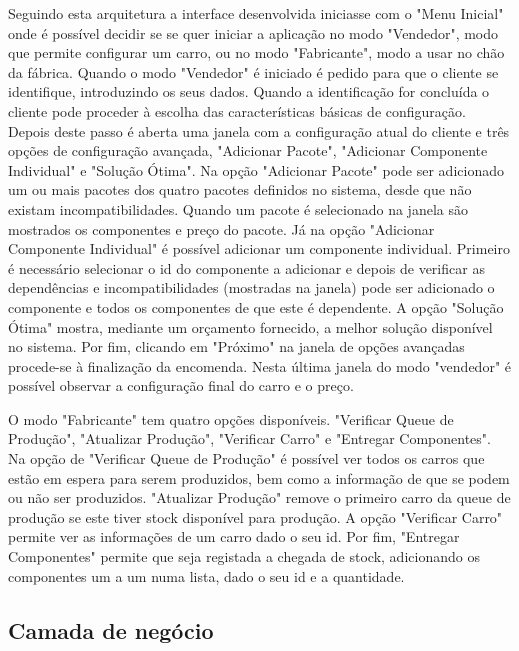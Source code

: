 \documentclass{llncs}
\begin{document}
Seguindo esta arquitetura a interface desenvolvida iniciasse com o "Menu Inicial" onde é possível decidir se se quer iniciar a aplicação no modo "Vendedor", modo que permite configurar um carro, ou no modo "Fabricante", modo a usar no chão da fábrica.
Quando o modo "Vendedor" é iniciado é pedido para que o cliente se identifique, introduzindo os seus dados. Quando a identificação for concluída o cliente pode proceder à escolha das características básicas de configuração. Depois deste passo é aberta uma janela com a configuração atual do cliente e três opções de configuração avançada, "Adicionar Pacote", "Adicionar Componente Individual" e "Solução Ótima". Na opção "Adicionar Pacote" pode ser adicionado um ou mais pacotes dos quatro pacotes definidos no sistema, desde que não existam incompatibilidades. Quando um pacote é selecionado na janela são mostrados os componentes e preço do pacote. Já na opção "Adicionar Componente Individual" é possível adicionar um componente individual. Primeiro é necessário selecionar o id do componente a adicionar e depois de verificar as dependências e incompatibilidades (mostradas na janela) pode ser adicionado o componente e todos os componentes de que este é dependente. A opção "Solução Ótima" mostra, mediante um orçamento fornecido, a melhor solução disponível no sistema. Por fim, clicando em "Próximo" na janela de opções avançadas procede-se à finalização da encomenda. Nesta última janela do modo "vendedor" é possível observar a configuração final do carro e o preço.

O modo "Fabricante" tem quatro opções disponíveis. "Verificar Queue de Produção", "Atualizar Produção", "Verificar Carro" e "Entregar Componentes". Na opção de "Verificar Queue de Produção" é possível ver todos os carros que estão em espera para serem produzidos, bem como a informação de que se podem ou não ser produzidos. "Atualizar Produção" remove o primeiro carro da queue de produção se este tiver stock disponível para produção. A opção "Verificar Carro" permite ver as informações de um carro dado o seu id. Por fim, "Entregar Componentes" permite que seja registada a chegada de stock, adicionando os componentes um a um numa lista, dado o seu id e a quantidade.

\subsection{Camada de negócio}

\end{document}
